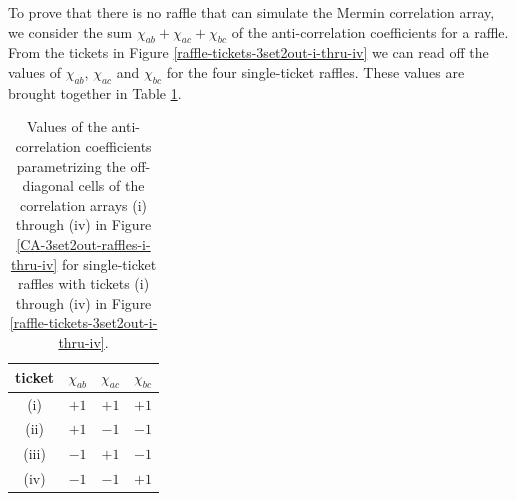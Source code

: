 To prove that there is no raffle that can simulate the Mermin correlation array, we consider the sum $\chi_{ab} + \chi_{ac} + \chi_{bc}$ of the anti-correlation coefficients for a raffle. From the tickets in Figure \ref{raffle-tickets-3set2out-i-thru-iv} we can read off the values of $\chi_{ab}$, $\chi_{ac}$ and $\chi_{bc}$ for the four single-ticket raffles. These values are brought together in Table \ref{values of chi}. 

\begin{table}[h]
\centering
\begin{tabular}{|c||c|c|c|}
\hline
ticket & \quad $\chi_{ab}$ \quad & \quad $\chi_{ac}$ \quad & \quad $\chi_{bc}$ \quad \\[.1cm] 
\hline
 (i) & $+1$ & $+1$ & $+1$ \\[.2cm]
 (ii) & $+1$ & $-1$ & $-1$ \\[.2cm]
 (iii) & $-1$ & $+1$ & $-1$ \\[.2cm]
(iv) & $-1$ & $-1$ & $+1$ \\
 \hline
\end{tabular}
\caption{Values of the anti-correlation coefficients parametrizing the off-diagonal cells of the correlation arrays (i) through (iv) in Figure \ref{CA-3set2out-raffles-i-thru-iv} for single-ticket raffles with tickets (i) through (iv) in Figure \ref{raffle-tickets-3set2out-i-thru-iv}.}
\label{values of chi}
\end{table} 

